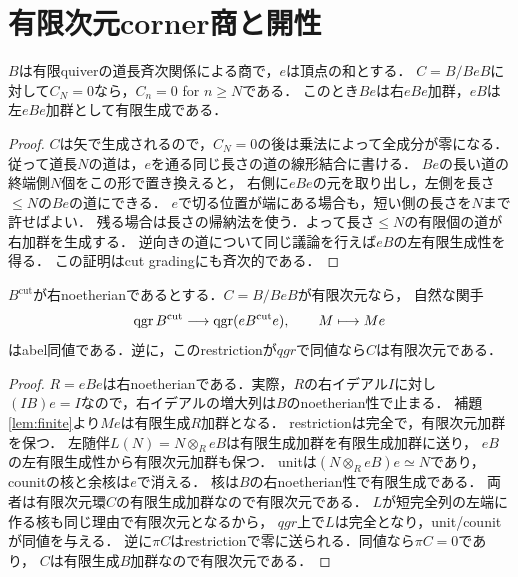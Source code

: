 \section{有限次元corner商と開性}
\begin{lemma}\label{lem:finite}
$B$は有限quiverの道長斉次関係による商で，$e$は頂点の和とする．
$C=B/BeB$に対して$C_N=0$なら，$C_n=0$ for $n\ge N$である．
このとき$Be$は右$eBe$加群，$eB$は左$eBe$加群として有限生成である．
\end{lemma}
\begin{proof}
$C$は矢で生成されるので，$C_N=0$の後は乗法によって全成分が零になる．
従って道長$N$の道は，$e$を通る同じ長さの道の線形結合に書ける．
$Be$の長い道の終端側$N$個をこの形で置き換えると，
右側に$eBe$の元を取り出し，左側を長さ$\le N$の$Be$の道にできる．
$e$で切る位置が端にある場合も，短い側の長さを$N$まで許せばよい．
残る場合は長さの帰納法を使う．よって長さ$\le N$の有限個の道が右加群を生成する．
逆向きの道について同じ議論を行えば$eB$の左有限生成性を得る．
この証明はcut gradingにも斉次的である．
\end{proof}

\begin{proposition}\label{prop:corner}
$B^{\mathrm{cut}}$が右noetherianであるとする．$C=B/BeB$が有限次元なら，
自然な関手
\begin{equation}\label{eq:equiv}
 \operatorname{qgr} B^{\mathrm{cut}}\longrightarrow\operatorname{qgr}(eB^{\mathrm{cut}}e),\qquad M\longmapsto Me
\end{equation}
はabel同値である．逆に，このrestrictionが$qgr$で同値なら$C$は有限次元である．
\end{proposition}
\begin{proof}
$R=eBe$は右noetherianである．実際，$R$の右イデアル$I$に対し
$(IB)e=I$なので，右イデアルの増大列は$B$のnoetherian性で止まる．
補題\ref{lem:finite}より$Me$は有限生成$R$加群となる．
restrictionは完全で，有限次元加群を保つ．
左随伴$L(N)=N\otimes_R eB$は有限生成加群を有限生成加群に送り，
$eB$の左有限生成性から有限次元加群も保つ．
unitは$(N\otimes_R eB)e\simeq N$であり，counitの核と余核は$e$で消える．
核は$B$の右noetherian性で有限生成である．
両者は有限次元環$C$の有限生成加群なので有限次元である．
$L$が短完全列の左端に作る核も同じ理由で有限次元となるから，
$qgr$上で$L$は完全となり，unit/counitが同値を与える．
逆に$\pi C$はrestrictionで零に送られる．同値なら$\pi C=0$であり，
$C$は有限生成$B$加群なので有限次元である．
\end{proof}

